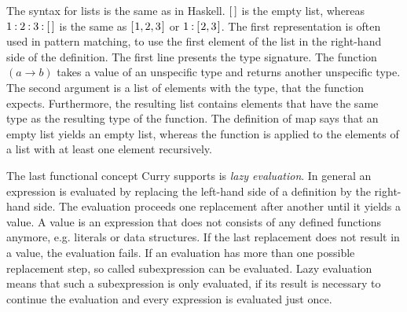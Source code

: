 \documentclass[%
	latex,%
	a4paper,%
	oneside,%
	chapterprefix,%
	headsepline,%
	12pt%
]{scrbook}
\newcommand{\Varid}[1]{\mathit{#1}}
\def\resethooks{%
  \global\let\SaveRestoreHook\empty
  \global\let\ColumnHook\empty}
\let\hspre\empty
\let\hspost\empty
\begin{document}
\resethooks

The syntax for lists is the same as in Haskell. %
\ensuremath{[\mskip1.5mu \mskip1.5mu]} is the empty list, whereas \ensuremath{\mathrm{1}\mathbin{:}\mathrm{2}\mathbin{:}\mathrm{3}\mathbin{:}[\mskip1.5mu \mskip1.5mu]} is the same as \ensuremath{[\mskip1.5mu \mathrm{1},\mathrm{2},\mathrm{3}\mskip1.5mu]} or
\ensuremath{\mathrm{1}\mathbin{:}[\mskip1.5mu \mathrm{2},\mathrm{3}\mskip1.5mu]}. %
The first representation is often used in pattern matching, to use the
first element of the list in the right-hand side of the definition. %
The first line presents the type signature. %
The function \ensuremath{(\Varid{a}\to \Varid{b})} takes a value of an unspecific type and returns
another unspecific type. %
The second argument is a list of elements with the type, that the
function expects. %
Furthermore, the resulting list contains elements that have the same
type as the resulting type of the function. %
The definition of map says that an empty list yields an empty list,
whereas the function is applied to the elements of a list with at
least one element recursively. %

The last functional concept Curry supports is \emph{lazy
  evaluation}. %
In general an expression is evaluated by replacing the left-hand side
of a definition by the right-hand side. %
The evaluation proceeds one replacement after another until it yields
a value. %
A value is an expression that does not consists of any defined
functions anymore, e.g. literals or data structures. %
If the last replacement does not result in a value, the evaluation
fails. %
If an evaluation has more than one possible replacement step, so
called subexpression can be evaluated. %
Lazy evaluation means that such a subexpression is only evaluated, if
its result is necessary to continue the evaluation and every
expression is evaluated just once. %
\end{document}
